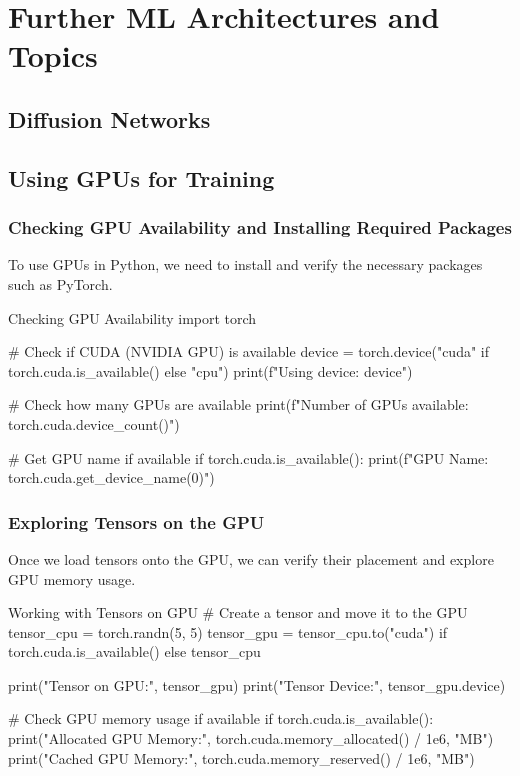 \chapter{Further ML Architectures and Topics}

\section{Diffusion Networks}


\section{Using GPUs for Training}
\subsection{Checking GPU Availability and Installing Required Packages}
To use GPUs in Python, we need to install and verify the necessary packages such as PyTorch.

\begin{codeonly}{Checking GPU Availability}
import torch

# Check if CUDA (NVIDIA GPU) is available
device = torch.device("cuda" if torch.cuda.is_available() else "cpu")
print(f"Using device: {device}")

# Check how many GPUs are available
print(f"Number of GPUs available: {torch.cuda.device_count()}")

# Get GPU name if available
if torch.cuda.is_available():
    print(f"GPU Name: {torch.cuda.get_device_name(0)}")
\end{codeonly}

\subsection{Exploring Tensors on the GPU}
Once we load tensors onto the GPU, we can verify their placement and explore GPU memory usage.

\begin{codeonly}{Working with Tensors on GPU}
# Create a tensor and move it to the GPU
tensor_cpu = torch.randn(5, 5)
tensor_gpu = tensor_cpu.to("cuda") if torch.cuda.is_available() else tensor_cpu

print("Tensor on GPU:", tensor_gpu)
print("Tensor Device:", tensor_gpu.device)

# Check GPU memory usage if available
if torch.cuda.is_available():
    print("Allocated GPU Memory:", torch.cuda.memory_allocated() / 1e6, "MB")
    print("Cached GPU Memory:", torch.cuda.memory_reserved() / 1e6, "MB")
\end{codeonly}


